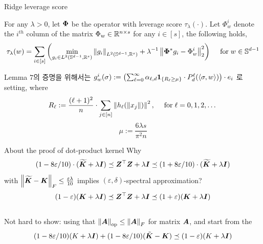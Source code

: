 \documentclass[9pt,t,aspectratio=169]{beamer}
\begin{document}
\begin{frame}{Ridge leverage score}
\begin{lemma}
For any $\lambda >0$, let ${\bm{\Phi}}$ be the operator with leverage score $\tau_{\lambda}(\cdot)$. Let $\Phi_w^i$ denote the $i^{th}$ column of the matrix $\Phi_w \in \mathbb{R}^{n \times s}$ for any $i \in [s]$, the following holds, 
\begin{equation*}
    \tau_{\lambda} (w) =  \sum_{i \in [s]} \left( \min_{g_i \in L^2 (\mathbb{S}^{d-1}, \mathbb{R}^s)} \left\lVert g_i\right\rVert_{L^2(\mathbb{S}^{d-1}, \mathbb{R}^s)} + \lambda^{-1} \left\lVert{\bm{\Phi}}^* g_i - \Phi_w^i \right\rVert_2^2 \right)  \quad \text{\;for\;} w \in \mathbb{S}^{d-1}
\end{equation*}
\end{lemma}
Lemma $7$의 증명을 위해서는 $g_w^i (\sigma) := \left( \sum_{\ell=0}^{\infty} \alpha_{\ell, d} \mathbf{1}_{\left\{ R_{\ell} \geq \mu \right\}} \cdot P_d^{\ell} ( \left\langle \sigma,w \right\rangle) \right) \cdot e_i$
로 setting, where 
\begin{equation*}
    R_{\ell} := \frac{(\ell +1)^2}{n} \cdot \sum_{j \in [n]} \left\lVert h_{\ell} (\left\lVert x_j\right\rVert)\right\rVert^2, \quad \text{\;for\;} \ell=0,1,2, \dots 
\end{equation*}
\begin{equation*}
    \mu := \frac{6 \lambda s}{\pi^2 n}
\end{equation*}
\end{frame}
\begin{frame}{About the proof of dot-product kernel}
Why 
\begin{equation*}
    (1- 8 \varepsilon / 10) \cdot (\widetilde{{\bm{K}}} + \lambda {\bm{I}}) \preceq {\bm{Z}}^{\top}{\bm{Z}} + \lambda {\bm{I}} \preceq (1+8\varepsilon/ 10) \cdot (\widetilde{{\bm{K}}} + \lambda {\bm{I}}) 
\end{equation*}
with $\left\lVert\widetilde{{\bm{K}}} - {\bm{K}}\right\rVert_F \leq \frac{\varepsilon \lambda}{10}$ implies $(\varepsilon, \delta)$-spectral approximation?
\begin{equation*}
    (1- \varepsilon) ({\bm{K}} + \lambda {\bm{I}}) \preceq {\bm{Z}}^{\top}{\bm{Z}} + \lambda {\bm{I}} \preceq (1+ \varepsilon) ({\bm{K}} + \lambda {\bm{I}}) 
\end{equation*}
\pause 
\\
Not hard to show: using that $\left\lVert{\bm{A}}\right\rVert_{\text{op}} \leq \left\lVert{\bm{A}}\right\rVert_F$ for matrix ${\bm{A}}$, and start from the 
\begin{equation*}
(1- 8 \varepsilon /10) (K+\lambda {\bm{I}}) +
 (1- 8 \varepsilon / 10) (\tilde{{\bm{K}}} - {\bm{K}}) \preceq (1- \varepsilon)(K + \lambda {\bm{I}})
\end{equation*}
\end{frame}
\end{document}
